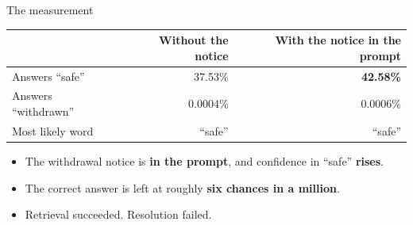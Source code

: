 \documentclass[aspectratio=169]{beamer}
\begin{document}
\begin{frame}{The measurement}
  \begin{center}
  \begin{tabular}{@{}lrr@{}}
    \toprule
    & \textbf{Without the notice} & \textbf{With the notice in the prompt} \\
    \midrule
    Answers ``safe''      & 37.53\% & \textcolor{update}{\textbf{42.58\%}} \\
    Answers ``withdrawn'' & 0.0004\% & 0.0006\% \\
    Most likely word      & ``safe'' & ``safe'' \\
    \bottomrule
  \end{tabular}
  \end{center}
  \vspace{1.1em}
  \begin{itemize}\setlength\itemsep{0.7em}
    \item The withdrawal notice is \textbf{in the prompt}, and confidence in ``safe'' \textbf{rises}.
    \item The correct answer is left at roughly \textbf{six chances in a million}.
    \item Retrieval succeeded. Resolution failed.
  \end{itemize}
\end{frame}
\end{document}
